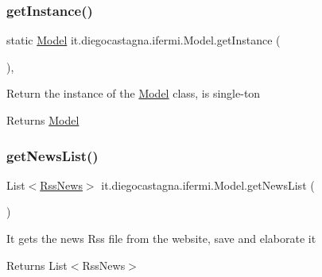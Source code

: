 \subsubsection{\texorpdfstring{getInstance()}{getInstance()}}
{\footnotesize\ttfamily static \mbox{\hyperlink{classit_1_1diegocastagna_1_1ifermi_1_1_model}{Model}} it.\+diegocastagna.\+ifermi.\+Model.\+get\+Instance (\begin{DoxyParamCaption}{ }\end{DoxyParamCaption})\hspace{0.3cm}{\ttfamily [inline]}, {\ttfamily [static]}}

Return the instance of the \mbox{\hyperlink{classit_1_1diegocastagna_1_1ifermi_1_1_model}{Model}} class, is single-\/ton \begin{DoxyReturn}{Returns}
\mbox{\hyperlink{classit_1_1diegocastagna_1_1ifermi_1_1_model}{Model}} 
\end{DoxyReturn}
\mbox{\label{classit_1_1diegocastagna_1_1ifermi_1_1_model_a41538c6de4e4fd7fe8a8eb668dffba1b}} 
\subsubsection{\texorpdfstring{getNewsList()}{getNewsList()}}
{\footnotesize\ttfamily List$<$\mbox{\hyperlink{classit_1_1diegocastagna_1_1ifermi_1_1_rss_news}{Rss\+News}}$>$ it.\+diegocastagna.\+ifermi.\+Model.\+get\+News\+List (\begin{DoxyParamCaption}{ }\end{DoxyParamCaption})\hspace{0.3cm}{\ttfamily [inline]}}

It gets the news Rss file from the website, save and elaborate it \begin{DoxyReturn}{Returns}
List$<$\+Rss\+News$>$ 
\end{DoxyReturn}
\mbox{\label{classit_1_1diegocastagna_1_1ifermi_1_1_model_a20afec0ef2cafa446628b2d7e852b34c}} 
